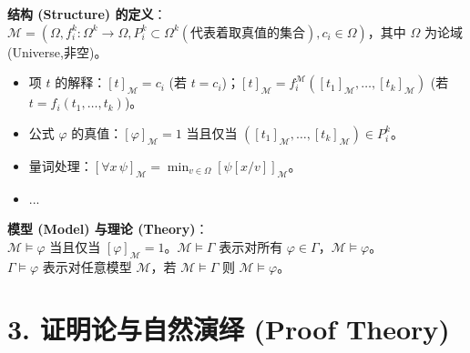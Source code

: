 \documentclass[12pt, a4paper]{article}
\begin{document}
\begin{mdframed}
    \textbf{结构 (Structure) 的定义}：\\
    \(\mathcal{M} = (\Omega, f_i^{k}:\Omega^k \to \Omega, P_i^{k} \subset \Omega^k(\text{代表着取真值的集合}), c_i \in \Omega )\)，其中 \(\Omega\) 为论域 (Universe,非空)。
    \begin{itemize}
        \item 项 \(t\) 的解释：\([t]_{\mathcal{M}} = c_i\) (若 \(t=c_i\))；\([t]_{\mathcal{M}} = f_i^{\mathcal{M}}([t_1]_{\mathcal{M}}, \dots, [t_k]_{\mathcal{M}})\) (若 \(t=f_i(t_1, \dots, t_k)\))。
        \item 公式 \(\varphi\) 的真值：\([\varphi]_{\mathcal{M}} = 1\) 当且仅当 \(([t_1]_{\mathcal{M}}, \dots, [t_k]_{\mathcal{M}}) \in P_i^{k}\)。
        \item 量词处理：\([\forall x \, \psi]_{\mathcal{M}} = \min_{v \in \Omega} [\psi[x/v]]_{\mathcal{M}}\)。
        \item ...
    \end{itemize}
    \textbf{模型 (Model) 与理论 (Theory)}：\\
    \(\mathcal{M} \models \varphi\) 当且仅当 \([\varphi]_{\mathcal{M}} = 1\)。\(\mathcal{M} \models \Gamma\) 表示对所有 \(\varphi \in \Gamma\)，\(\mathcal{M} \models \varphi\)。\\
    \(\Gamma \models \varphi\) 表示对任意模型 \(\mathcal{M}\)，若 \(\mathcal{M} \models \Gamma\) 则 \(\mathcal{M} \models \varphi\)。
\end{mdframed}

\section*{3. 证明论与自然演绎 (Proof Theory)}
\end{document}
